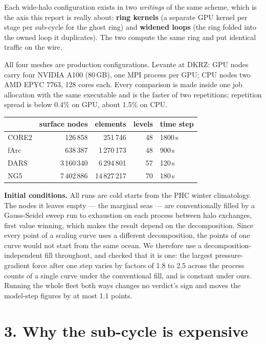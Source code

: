 \documentclass[11pt,a4paper]{article}
\begin{document}
Each wide-halo configuration exists in two \emph{writings} of the same scheme, which is the axis
this report is really about: \textbf{ring kernels} (a separate GPU kernel per stage per sub-cycle
for the ghost ring) and \textbf{widened loops} (the ring folded into the owned loop it duplicates).
The two compute the same ring and put identical traffic on the wire.

All four meshes are production configurations. Levante at DKRZ: GPU nodes carry four NVIDIA A100
(80\,GB), one MPI process per GPU; CPU nodes two AMD EPYC 7763, 128 cores each. Every comparison is
made inside one job allocation with the same executable and is the faster of two repetitions;
repetition spread is below 0.4\% on GPU, about 1.5\% on CPU.

\begin{center}\small
\begin{tabular}{@{}lrrrl@{}}
\toprule
& \textbf{surface nodes} & \textbf{elements} & \textbf{levels} & \textbf{time step} \\
\midrule
CORE2 & 126\,858 & 251\,746 & 48 & 1800\,s \\
fArc  & 638\,387 & 1\,270\,173 & 48 & 900\,s \\
DARS  & 3\,160\,340 & 6\,294\,801 & 57 & 120\,s \\
NG5   & 7\,402\,886 & 14\,827\,217 & 70 & 180\,s \\
\bottomrule
\end{tabular}
\end{center}

\textbf{Initial conditions.} All runs are cold starts from the PHC winter climatology. The nodes it
leaves empty --- the marginal seas --- are conventionally filled by a Gauss-Seidel sweep run to
exhaustion on each process between halo exchanges, first value winning, which makes the result
depend on the decomposition. Since every point of a scaling curve uses a different decomposition,
the points of one curve would not start from the same ocean. We therefore use a
decomposition-independent fill throughout, and checked that it is one: the largest
pressure-gradient force after one step varies by factors of 1.8 to 2.5 across the process counts of
a single curve under the conventional fill, and is constant under ours. Running the whole fleet
both ways changes no verdict's sign and moves the model-step figures by at most 1.1 points.

\section*{3. Why the sub-cycle is expensive}
\end{document}
